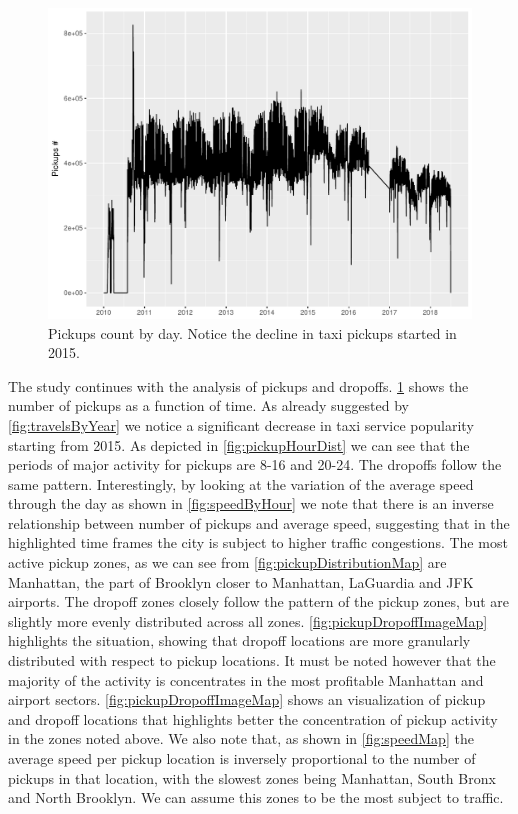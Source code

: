 \documentclass{acm_proc_article-sp-sigmod09}
\begin{document}
\begin{figure}
	\centering
	\includegraphics[width=1\columnwidth]{resources/base_plots/overall_pickups.pdf}
	\caption{Pickups count by day. Notice the decline in taxi pickups started in 2015.}
	\label{fig:overallPickups}
\end{figure}

The study continues with the analysis of pickups and dropoffs. \cref{fig:overallPickups} shows the number of pickups as a function of time. As already suggested by \cref{fig:travelsByYear} we notice a significant decrease in taxi service popularity starting from 2015. As depicted in \cref{fig:pickupHourDist} we can see that the periods of major activity for pickups are 8-16 and 20-24. The dropoffs follow the same pattern. Interestingly, by looking at the variation of the average speed through the day as shown in \cref{fig:speedByHour} we note that there is an inverse relationship between number of pickups and average speed, suggesting that in the highlighted time frames the city is subject to higher traffic congestions.
The most active pickup zones, as we can see from \cref{fig:pickupDistributionMap} are Manhattan, the part of Brooklyn closer to Manhattan, LaGuardia and JFK airports. The dropoff zones closely follow the pattern of the pickup zones, but are slightly more evenly distributed across all zones. \cref{fig:pickupDropoffImageMap} highlights the situation, showing that dropoff locations are more granularly distributed with respect to pickup locations. It must be noted however that the majority of the activity is concentrates in the most profitable Manhattan and airport sectors. \cref{fig:pickupDropoffImageMap} shows an  visualization of pickup and dropoff locations that highlights better the concentration of pickup activity in the zones noted above.
We also note that, as shown in \cref{fig:speedMap} the average speed per pickup location is inversely proportional to the number of pickups in that location, with the slowest zones being Manhattan, South Bronx and North Brooklyn. We can assume this zones to be the most subject to traffic.
\end{document}
